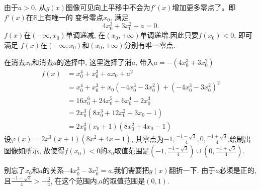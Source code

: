 \begin{jie}
\begin{way1}
\begin{figure}[H]
\begin{tikzpicture}
            \end{tikzpicture}
        \end{figure}
        由于\(a>0\), 从\(g(x)\)图像可见向上平移中不会为\(f'(x)\)增加更多零点了。即\(f'(x)\)在\(\mathbb{R}\)上有唯一的
        变号零点\(x_0\), 满足
        \begin{equation}
            4x_0^3+3x_0^2+a=0. 
        \end{equation}
        \(f(x)\)在\((-\infty,x_0)\)单调递减, 在\((x_0,+\infty)\)单调递增.因此只要\(f(x_0)<0\), 即可满足
        \(f(x)\)在\((-\infty,x_0)\)和\((x_0,+\infty)\)分别有唯一零点.

        在消去\(x_0\)和消去\(a\)的选择中, 这里选择了消\(a\), 带入\(a=-(4x_0^3+3x_0^2) \)
        \begin{align*}
            f(x)&=x^4_0+x^3_0+ax_0+a^2\\
                &=x^4_0+x^3_0+x_0(-4x_0^3-3x_0^2)+(-4x_0^3-3x_0^2)^2\\
                &=16x_0^6+24x_0^5+6x_0^4-2x_0^3\\
                &=2x_0^3(8x_0^3+12x_0^2+3x_0-1)\\
                &=2x_0^3(x_0+1)(8x_0^2+4x_0-1)
        \end{align*}
        设\(\varphi(x)=2x^3(x+1)(8x^2+4x-1)\), 其零点为\(-1,\frac{-1-\sqrt{3}}{4},0,\frac{-1+\sqrt{3}}{4}\).绘制出图像如所示,
        故使得\(f(x_0)<0\)的\(x_0\)取值范围是\((-1,\frac{-1-\sqrt{3}}{4})\cup(0,\frac{-1+\sqrt{3}}{4})\).
        
        别忘了\(x_0\)和\(a\)的关系\(-4x_0^3-3x_0^2=a\),我们需要把\(g(x)\)翻折一下. 由于\(a\)必须是正的,且\(\frac{-1-\sqrt{3}}{4}>-\frac{3}{4}\),
        在这个范围内,\(a\)的取值范围是\((0,1)\).
    \end{way1}
    \begin{way2}
        
    \end{way2}
\end{jie}

